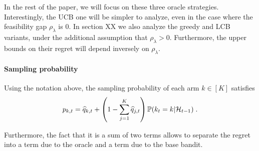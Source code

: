 In the rest of the paper, we will focus on these three oracle strategies. Interestingly, the UCB one will be simpler to analyze, even in the case where the feasibility gap $\rho_\lambda$ is $0$. In section XX we also analyze the greedy and LCB variants, under the additional assumption that $\rho_\lambda>0$. Furthermore, the upper bounds on their regret will depend inversely on $\rho_\lambda$.


\paragraph{Sampling probability} Using the notation above, the sampling probability of each arm $k \in [K]$ satisfies 
\begin{equation}\label{eq::sampling_prob} p_{k,t} = \widehat{q}_{k, t} + \left(1-\sum_{j=1}^K \widehat{q}_{j, t}\right) \mathbb{P}(k_t=k | \mathcal{H}_{t-1}) \;. \end{equation}

Furthermore, the fact that it is a sum of two terms allows to separate the regret into a term due to the oracle and a term due to the base bandit.  
